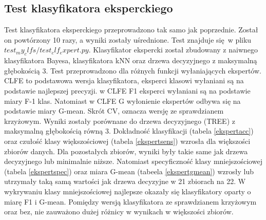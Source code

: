 \subsection{Test klasyfikatora eksperckiego}
Test klasyfikatora eksperckiego przeprowadzono tak samo jak poprzednie. Został on powtórzony 10 razy, a wyniki zostały uśrednione. Test znajduje się w pliku $test_my_clfs/test_clf_expert.py$. Klasyfikator ekspercki został zbudowany z naiwnego klasyfikatora Bayesa, klasyfikatora kNN oraz drzewa decyzyjnego z maksymalną głębokością 3. Test przeprowadzono dla różnych funkcji wyłaniających ekspertów. CLFE to podstawowa wersja klasyfikatora, eksperci klasowi wyłaniani są na podstawie najlepszej precyzji. w CLFE F1 eksperci wyłaniani są na podstawie miary F-1 klas. Natomiast w CLFE G wyłonienie ekspertów odbywa się na podstawie miary G-mean. Skrót CV, oznacza wersję ze sprawdzianem krzyżowym. Wyniki zostały porównane do drzewa decyzyjnego (TREE) z maksymalną głębokością równą 3. Dokładność klasyfikacji (tabela \ref{ekspertacc}) oraz czułość klasy większościowej (tabela \ref{ekspertsens}) wzrosła dla większości zbiorów danych. Dla pozostałych zbiorów, wyniki były takie same jak drzewa decyzyjnego lub minimalnie niższe. Natomiast specyficzność klasy mniejszościowej (tabela \ref{ekspertspec}) oraz miara G-mean (tabeela \ref{ekspertgmean}) wzrosły lub utrzymały taką samą wartości jak drzewa decyzyjne w 21 zbiorach na 22. W wykrywaniu klasy mniejszościowej najlepsze okazały się klasyfikatory oparty o miarę F1 i G-mean. Pomiędzy wersją klasyfikatora ze sprawdzianem krzyżowym oraz bez, nie zauważono dużej różnicy w wynikach w większości zbiorów.
